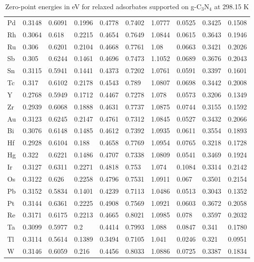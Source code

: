 \begin{table}[h]
{\begin{tabular}{*{10}{l}}
    Pd & 0.3148 & 0.6091 & 0.1996 & 0.4778 & 0.7402 & 1.0777 & 0.0525 & 0.3425 & 0.1508 \\
    Rh & 0.3064 & 0.618  & 0.2215 & 0.4654 & 0.7649 & 1.0844 & 0.0615 & 0.3643 & 0.1946 \\
    Ru & 0.306  & 0.6201 & 0.2104 & 0.4668 & 0.7761 & 1.08   & 0.0663 & 0.3421 & 0.2026 \\
    Sb & 0.305  & 0.6244 & 0.1461 & 0.4696 & 0.7473 & 1.1052 & 0.0689 & 0.3676 & 0.2043 \\
    Sn & 0.3115 & 0.5941 & 0.1441 & 0.4373 & 0.7202 & 1.0761 & 0.0591 & 0.3397 & 0.1601 \\
    Tc & 0.317  & 0.6102 & 0.2178 & 0.4543 & 0.789  & 1.0807 & 0.0698 & 0.3442 & 0.2008 \\
    Y  & 0.2768 & 0.5949 & 0.1712 & 0.4467 & 0.7278 & 1.078  & 0.0573 & 0.3206 & 0.1349 \\
    Zr & 0.2939 & 0.6068 & 0.1888 & 0.4631 & 0.7737 & 1.0875 & 0.0744 & 0.3155 & 0.1592 \\
    Au & 0.3123 & 0.6245 & 0.2147 & 0.4761 & 0.7312 & 1.0845 & 0.0527 & 0.3432 & 0.2066 \\
    Bi & 0.3076 & 0.6148 & 0.1485 & 0.4612 & 0.7392 & 1.0935 & 0.0611 & 0.3554 & 0.1893 \\
    Hf & 0.2928 & 0.6104 & 0.188  & 0.4658 & 0.7769 & 1.0954 & 0.0765 & 0.3218 & 0.1728 \\
    Hg & 0.322  & 0.6221 & 0.1486 & 0.4707 & 0.7338 & 1.0809 & 0.0541 & 0.3469 & 0.1924 \\
    Ir & 0.3127 & 0.6311 & 0.2271 & 0.4818 & 0.753  & 1.074  & 0.1084 & 0.3314 & 0.2142 \\
    Os & 0.3122 & 0.626  & 0.2258 & 0.4796 & 0.7531 & 1.0911 & 0.067  & 0.3501 & 0.2154 \\
    Pb & 0.3152 & 0.5834 & 0.1401 & 0.4239 & 0.7113 & 1.0486 & 0.0513 & 0.3043 & 0.1352 \\
    Pt & 0.3144 & 0.6361 & 0.2225 & 0.4908 & 0.7569 & 1.0921 & 0.0603 & 0.3672 & 0.2058 \\
    Re & 0.3171 & 0.6175 & 0.2213 & 0.4665 & 0.8021 & 1.0985 & 0.078  & 0.3597 & 0.2032 \\
    Ta & 0.3099 & 0.5977 & 0.2    & 0.4414 & 0.7993 & 1.088  & 0.0847 & 0.341  & 0.1780 \\
    Tl & 0.3114 & 0.5614 & 0.1389 & 0.3494 & 0.7105 & 1.041  & 0.0246 & 0.321  & 0.0951 \\
    W  & 0.3146 & 0.6059 & 0.216  & 0.4456 & 0.8033 & 1.0886 & 0.0725 & 0.3387 & 0.1834 \\
    \hline
  \end{tabular}
  }
  \caption{Zero-point energies in eV for relaxed adsorbates supported on g-C$_3$N$_4$ at 298.15 K}
  \label{si_table7}
\end{table}


